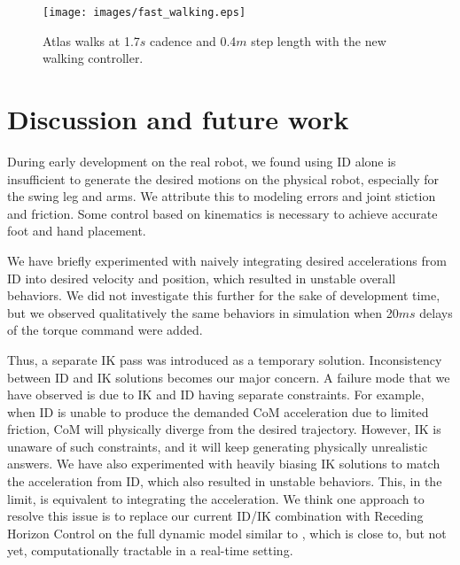 \documentclass{ws-ijhr}
\begin{document}
\begin{figure} 
  \begin{center}
    {\texttt{[image: images/fast\_walking.eps]}}
    \caption{Atlas walks at 1.7$s$ cadence and 0.4$m$ step length with the
		new walking controller.} \label{fig:fast_walking}
  \end{center}
\end{figure}   


\section{Discussion and future work}
During early development on the real robot, we found using ID alone is 
insufficient to generate the desired motions on the physical robot, especially 
for the swing leg and arms. 
We attribute this to modeling errors and joint stiction and friction.
Some control based on kinematics is necessary to achieve accurate foot and hand 
placement. 

We have briefly experimented with naively integrating desired accelerations 
from ID into desired velocity and position, which resulted in unstable overall 
behaviors. We did not investigate this further for the sake of development time, but 
we observed qualitatively the same behaviors in simulation when 20$ms$ delays 
of the torque command were added.

Thus, a separate IK pass was introduced as a temporary solution. 
Inconsistency between ID and IK solutions becomes our major concern. 
A failure mode that we have observed is due to IK and ID having separate constraints. For 
example, when ID is unable to produce the demanded CoM acceleration due to 
limited friction, CoM will physically diverge from the desired trajectory. 
However, IK is unaware of such constraints, and it will keep generating
physically unrealistic answers. We have also experimented with heavily 
biasing IK solutions to match the acceleration from ID, which also resulted in 
unstable behaviors. This, in the limit, is equivalent to integrating the 
acceleration. We think one approach to resolve this issue is to replace our 
current ID/IK combination with Receding Horizon Control on the full dynamic 
model similar to \cite{tass_mpc}, which is close to, but not yet, 
computationally tractable in a real-time setting.
\end{document}
